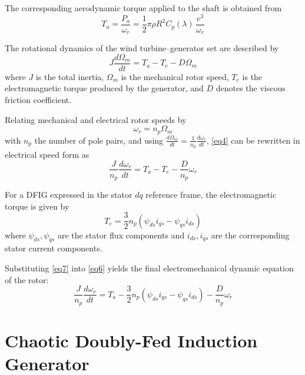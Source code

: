 \documentclass[conference]{IEEEtran}
\begin{document}
The corresponding aerodynamic torque applied to the shaft is obtained from
\begin{equation}
T_{a} = \frac{P_{a}}{\omega_{r}} = \frac{1}{2}\pi\rho R^{2}C_{p}(\lambda)\,\frac{v^{3}}{\omega_{r}}
\label{eq3}
\end{equation}

The rotational dynamics of the wind turbine--generator set are described by
\begin{equation}
J\frac{d\Omega_{m}}{dt} = T_{a} - T_{e} - D\Omega_{m}
\label{eq4}
\end{equation}
where $J$ is the total inertia, $\Omega_{m}$ is the mechanical rotor speed, $T_{e}$ is the electromagnetic torque produced by the generator, and $D$ denotes the viscous friction coefficient.

Relating mechanical and electrical rotor speeds by
\begin{equation}
\omega_{r} = n_{p}\Omega_{m}
\label{eq5}
\end{equation}
with $n_{p}$ the number of pole pairs, and using $\frac{d\Omega_{m}}{dt} = \frac{1}{n_{p}}\frac{d\omega_{r}}{dt}$, \eqref{eq4} can be rewritten in electrical speed form as
\begin{equation}
\frac{J}{n_{p}}\frac{d\omega_{r}}{dt} = T_{a} - T_{e} - \frac{D}{n_{p}}\omega_{r}
\label{eq6}
\end{equation}

For a DFIG expressed in the stator $dq$ reference frame, the electromagnetic torque is given by
\begin{equation}
T_{e} = \frac{3}{2}n_{p}\left( \psi_{ds}i_{qs} - \psi_{qs}i_{ds} \right)
\label{eq7}
\end{equation}
where $\psi_{ds},\psi_{qs}$ are the stator flux components and $i_{ds},i_{qs}$ are the corresponding stator current components.

Substituting \eqref{eq7} into \eqref{eq6} yields the final electromechanical dynamic equation of the rotor:
\begin{equation}
\frac{J}{n_{p}}\frac{d\omega_{r}}{dt} = T_{a} - \frac{3}{2}n_{p}\left( \psi_{ds}i_{qs} - \psi_{qs}i_{ds} \right) - \frac{D}{n_{p}}\omega_{r}
\label{eq8}
\end{equation}

\section{Chaotic Doubly-Fed Induction Generator}
\end{document}
